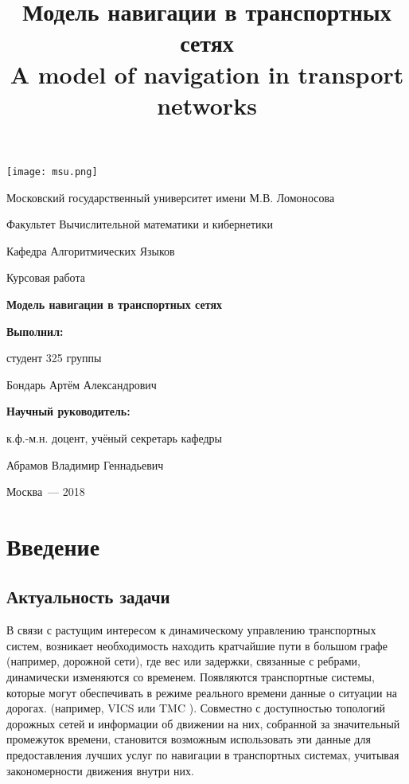\documentclass[12pt]{article}
\title{Модель навигации в транспортных сетях \\
       A model of navigation in transport networks}
\date{\vspace{-5ex}}
\begin{document}
\thispagestyle{empty}
\begin{center}
\texttt{[image: msu.png]}
\end{center}
\begingroup \fontsize{14pt}{16pt}\selectfont
\centerline{Московский
государственный
университет
имени М.В. Ломоносова}
\centerline{Факультет Вычислительной математики и кибернетики}
\centerline{Кафедра Алгоритмических Языков}
\vfill
\vfill
\vfill
\vfill
 \fontsize{22pt}{24pt}\selectfont
\centerline{Курсовая работа}
\vfill
 \fontsize{20pt}{24pt}\selectfont
\begin{center}
{\bf   Модель навигации в транспортных сетях}
\end{center}
\normalsize
\vfill
\vfill
\vfill
\vfill
\large
\begin{flushright}
\textbf{Выполнил:}

студент 325 группы

Бондарь Артём Александрович

\vfill
\textbf{Научный руководитель:}

к.ф.-м.н. доцент, учёный секретарь кафедры

Абрамов Владимир Геннадьевич
\end{flushright}
\normalsize
\vfill
\vfill
\vfill
\centerline{Москва~---            2018}
\endgroup

\pagebreak
\tableofcontents
\pagebreak

\section{Введение}

\subsection{Актуальность задачи}

В связи с растущим интересом к динамическому управлению транспортных систем, возникает необходимость находить кратчайшие пути в большом графе (например, дорожной сети), где вес или задержки, связанные с ребрами, динамически изменяются со временем. Появляются транспортные системы, которые могут обеспечивать в режиме реального времени данные о ситуации на дорогах. (например, VICS \cite{vics} или TMC \cite{tmc}). Совместно с доступностью топологий дорожных сетей и информации об движении на них, собранной за значительный промежуток времени, становится возможным использовать эти данные для предоставления лучших услуг по навигации в транспортных системах, учитывая закономерности движения внутри них.
\end{document}
